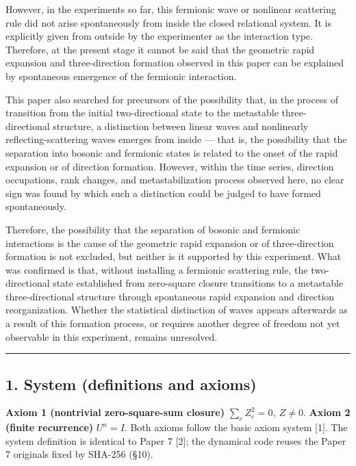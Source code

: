 \documentclass[
  a4paper,
]{article}
\begin{document}
However, in the experiments so far, this fermionic wave or nonlinear
scattering rule did not arise spontaneously from inside the closed
relational system. It is explicitly given from outside by the
experimenter as the interaction type. Therefore, at the present stage it
cannot be said that the geometric rapid expansion and three-direction
formation observed in this paper can be explained by spontaneous
emergence of the fermionic interaction.

This paper also searched for precursors of the possibility that, in the
process of transition from the initial two-directional state to the
metastable three-directional structure, a distinction between linear
waves and nonlinearly reflecting-scattering waves emerges from inside
--- that is, the possibility that the separation into bosonic and
fermionic states is related to the onset of the rapid expansion or of
direction formation. However, within the time series, direction
occupations, rank changes, and metastabilization process observed here,
no clear sign was found by which such a distinction could be judged to
have formed spontaneously.

Therefore, the possibility that the separation of bosonic and fermionic
interactions is the cause of the geometric rapid expansion or of
three-direction formation is not excluded, but neither is it supported
by this experiment. What was confirmed is that, without installing a
fermionic scattering rule, the two-directional state established from
zero-square closure transitions to a metastable three-directional
structure through spontaneous rapid expansion and direction
reorganization. Whether the statistical distinction of waves appears
afterwards as a result of this formation process, or requires another
degree of freedom not yet observable in this experiment, remains
unresolved.

\begin{center}\rule{0.5\linewidth}{0.5pt}\end{center}

\subsection{1. System (definitions and
axioms)}\label{system-definitions-and-axioms}

\textbf{Axiom 1 (nontrivial zero-square-sum closure)}
\(\sum_e Z_e^2=0,\ Z\neq0\). \textbf{Axiom 2 (finite recurrence)}
\(U^n=I\). Both axioms follow the basic axiom system {[}1{]}. The system
definition is identical to Paper 7 {[}2{]}; the dynamical code reuses
the Paper 7 originals fixed by SHA-256 (§10).
\end{document}
